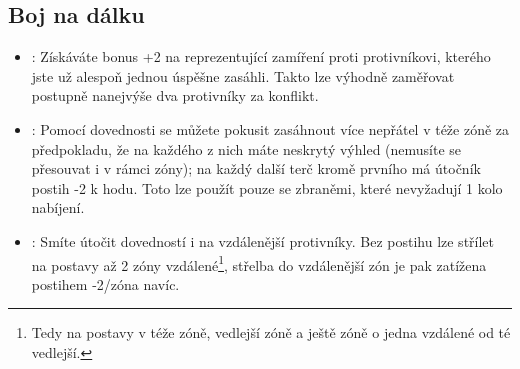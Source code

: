 \documentclass[../main.tex]{subfiles}
\begin{document}
\subsection{Boj na dálku}
\label{sec:trik-bnd}
\begin{itemize}
\item{}:
\label{sec:bnd-odstrelovac}
Získáváte bonus +2 na  reprezentující zamíření proti protivníkovi, kterého jste už alespoň jednou úspěšne zasáhli. Takto lze výhodně zaměřovat postupně nanejvýše dva protivníky za konflikt.

\item{}:
\label{sec:bnd-mnohonasobny}
Pomocí dovednosti  se můžete pokusit zasáhnout více nepřátel v téže zóně za předpokladu, že na každého z nich máte neskrytý výhled (nemusíte se přesouvat i v rámci zóny); na každý další terč kromě prvního má útočník postih -2 k hodu. Toto lze použít pouze se zbraněmi, které nevyžadují 1 kolo nabíjení.

\item {}:
\label{sec:bnd-odstrelovac}
Smíte útočit dovedností  i na vzdálenější protivníky. Bez postihu lze střílet na postavy až 2 zóny vzdálené\footnote{Tedy na postavy v téže zóně, vedlejší zóně a ještě zóně o jedna vzdálené od té vedlejší.}, střelba do vzdálenější zón je pak zatížena postihem -2/zóna navíc. 

\end{itemize}
  
\end{document}
